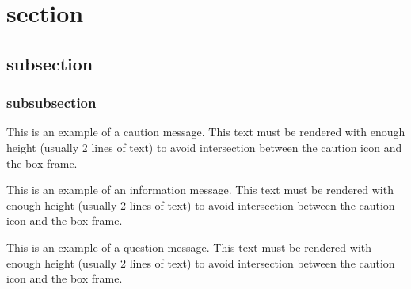 \documentclass[article, backcover, french, nodocumentinfo]{upmethodology-document}
\begin{document}
	\upmdocumentsummary{}
	\upmdocumentauthors{}
	\upmdocumentinformedpeople{}
	\upmpublicationpage{}
	\thispagestyle{empty}
	\tableofcontents{}
	\newpage{}

	\section{section}
		\subsection{subsection}
			\subsubsection{subsubsection}
				\begin{upmcaution}
					This is an example of a caution message. This text must be rendered with enough height (usually 2 lines of text) to avoid intersection between the caution icon and the box frame.
				\end{upmcaution}
				\begin{upminfo}
					This is an example of an information message. This text must be rendered with enough height (usually 2 lines of text) to avoid intersection between the caution icon and the box frame.
				\end{upminfo}
				\begin{upmquestion}
					This is an example of a question message. This text must be rendered with enough height (usually 2 lines of text) to avoid intersection between the caution icon and the box frame.
				\end{upmquestion}
\end{document}
